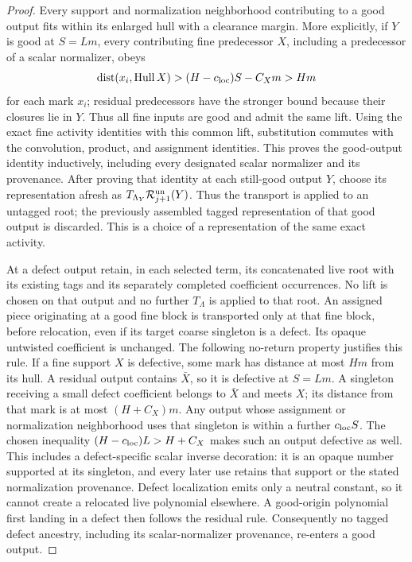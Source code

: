 \begin{proof}
Every support and normalization neighborhood contributing to a good
output fits within its enlarged hull with a clearance margin. More
explicitly, if \(Y\) is good at \(S=Lm\), every contributing fine
predecessor \(X\), including a predecessor of a scalar normalizer, obeys
\[
 \operatorname{dist}(x_i,\operatorname{Hull}X)
 >(H-c_{\rm loc})S-C_Xm>Hm
\]
for each mark \(x_i\); residual predecessors have the stronger bound
because their closures lie in \(Y\). Thus all fine inputs are good and
admit the same lift. Using the exact fine activity identities with this
common lift, substitution commutes with the convolution, product, and assignment identities.
This proves the good-output identity inductively, including every
designated scalar normalizer and its provenance. After proving that
identity at each still-good output \(Y\), choose its representation
afresh as \(T_{\Lambda_Y}\mathcal R_{j+1}^{\rm un}(Y)\). Thus the
transport is applied to an untagged root; the previously assembled tagged
representation of that good output is discarded. This is a choice of a
representation of the same exact activity.

At a defect output retain, in each selected term, its concatenated live
root with its existing tags and its separately completed coefficient
occurrences. No lift is chosen on that output and no further
\(T_\Lambda\) is applied to that root. An assigned piece originating at a
good fine block is transported only at that fine block, before relocation,
even if its target coarse
singleton is a defect. Its opaque untwisted coefficient is unchanged.
The following no-return property justifies this rule. If a fine support
\(X\) is defective, some mark has distance at most \(Hm\) from its hull.
A residual output contains \(\bar X\), so it is defective at \(S=Lm\).
A singleton receiving a small defect coefficient belongs to \(\bar X\)
and meets \(X\); its distance from that mark is at most \((H+C_X)m\).
Any output whose assignment or normalization neighborhood uses that
singleton is within a further \(c_{\rm loc}S\). The chosen inequality
\((H-c_{\rm loc})L>H+C_X\) makes such an output defective as well.
This includes a defect-specific scalar inverse decoration: it is an
opaque number supported at its singleton, and every later use retains
that support or the stated normalization provenance. Defect localization
emits only a neutral constant, so it cannot create a relocated live
polynomial elsewhere. A good-origin polynomial first landing in a defect
then follows the residual rule. Consequently no tagged defect ancestry,
including its scalar-normalizer provenance, re-enters a good output.


\end{proof}
